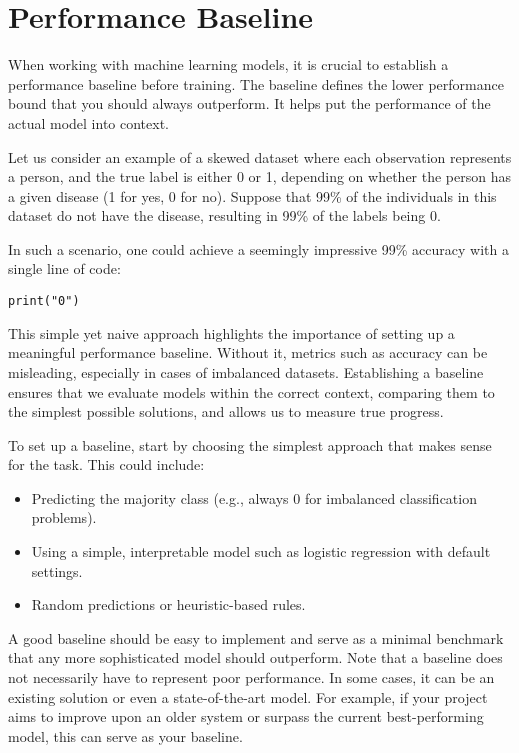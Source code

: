 \documentclass[12pt,openany]{book}
\begin{document}
\section{Performance Baseline} \label{sec:performance_baseline}

When working with machine learning models, it is crucial to establish a performance baseline before training. The baseline defines the lower performance bound that you should always outperform. It helps put the performance of the actual model into context. \newline

Let us consider an example of a skewed dataset where each observation represents a person, and the true label is either 0 or 1, depending on whether the person has a given disease (1 for yes, 0 for no). Suppose that 99\% of the individuals in this dataset do not have the disease, resulting in 99\% of the labels being 0.

In such a scenario, one could achieve a seemingly impressive 99\% accuracy with a single line of code:

\begin{verbatim}
print("0")
\end{verbatim}

This simple yet naive approach highlights the importance of setting up a meaningful performance baseline. Without it, metrics such as accuracy can be misleading, especially in cases of imbalanced datasets. Establishing a baseline ensures that we evaluate models within the correct context, comparing them to the simplest possible solutions, and allows us to measure true progress. \newline

To set up a baseline, start by choosing the simplest approach that makes sense for the task. This could include:
\begin{itemize}
    \item Predicting the majority class (e.g., always 0 for imbalanced classification problems).
    \item Using a simple, interpretable model such as logistic regression with default settings.
    \item Random predictions or heuristic-based rules.
\end{itemize}

A good baseline should be easy to implement and serve as a minimal benchmark that 
any more sophisticated model should outperform. Note that a baseline does not 
necessarily have to represent poor performance. In some cases, it can be an existing 
solution or even a state-of-the-art model. For example, if your project aims to 
improve upon an older system or surpass the current best-performing model, this 
can serve as your baseline. \newline
\end{document}
